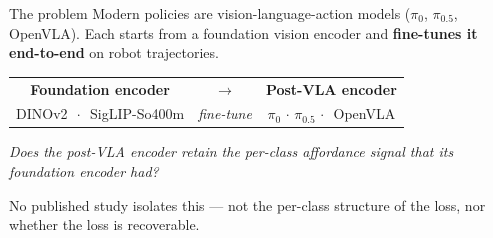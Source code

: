 \documentclass[10pt,aspectratio=169]{beamer}
\newcommand{\hl}[1]{\textcolor{emph}{\textbf{#1}}}
\begin{document}
\begin{frame}{The problem}
  \vspace{0.2em}
  Modern policies are vision-language-action models ($\pi_0$, $\pi_{0.5}$, OpenVLA). Each starts from a foundation vision encoder and \hl{fine-tunes it end-to-end} on robot trajectories.

  \vspace{1.2em}
  \begin{center}
    \begin{tabular}{c@{\hskip 2em}c@{\hskip 2em}c}
      \textbf{Foundation encoder} & $\longrightarrow$ & \textbf{Post-VLA encoder} \\
      \small DINOv2 $\,\cdot\,$ SigLIP-So400m & {\small\itshape fine-tune} & \small $\pi_0\,\cdot\,\pi_{0.5}\,\cdot\,$ OpenVLA \\
    \end{tabular}
  \end{center}

  \vspace{1.4em}
  \begin{center}\emph{Does the post-VLA encoder retain the per-class affordance signal that its foundation encoder had?}\end{center}

  \vspace{0.5em}
  {\color{muted}\small No published study isolates this --- not the per-class structure of the loss, nor whether the loss is recoverable.}
\end{frame}
\end{document}
